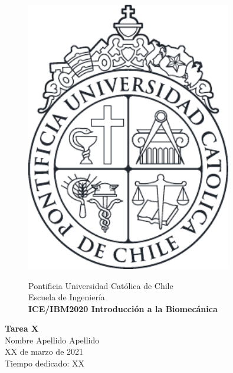 \documentclass[10pt]{article}
\theoremstyle{definition}
\theoremstyle{remark}
\theoremstyle{definition}
\begin{document}
\begin{titlepage}
	\begin{figure}
		\begin{minipage}{2cm}
			\includegraphics[width=0.8\textwidth]{./figures/LogoUC-BN}
		\end{minipage}
		\begin{minipage}{14.5cm}
			\vspace{4mm}
			{\sc Pontificia Universidad Católica de Chile}\\
			Escuela de Ingeniería\\
			{\bf ICE/IBM2020 Introducción a la Biomecánica}\\
			\vspace{0mm}
			\hrulefill
		\end{minipage}
	\end{figure}
	\phantom{""}\vspace{60mm}
	\begin{center}
		\Huge{\textbf{Tarea X}}\vspace{95mm}\\
		\raggedleft \Large{Nombre Apellido Apellido}\\
		XX de marzo de 2021\\
		Tiempo dedicado: XX
	\end{center}
\end{titlepage}
\end{document}
